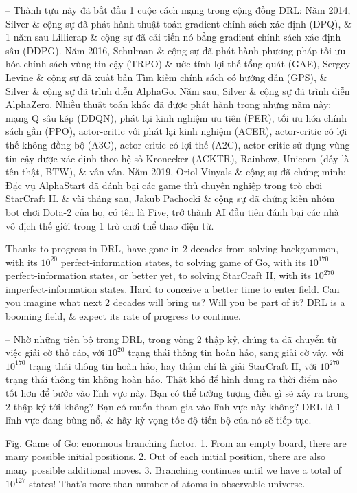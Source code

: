 \documentclass{article}
\begin{document}
\begin{itemize}
\begin{itemize}
\begin{itemize}
\begin{itemize}
                -- Thành tựu này đã bắt đầu 1 cuộc cách mạng trong cộng đồng DRL: Năm 2014, Silver \& cộng sự đã phát hành thuật toán gradient chính sách xác định (DPQ), \& 1 năm sau Lillicrap \& cộng sự đã cải tiến nó bằng gradient chính sách xác định sâu (DDPG). Năm 2016, Schulman \& cộng sự đã phát hành phương pháp tối ưu hóa chính sách vùng tin cậy (TRPO) \& ước tính lợi thế tổng quát (GAE), Sergey Levine \& cộng sự đã xuất bản Tìm kiếm chính sách có hướng dẫn (GPS), \& Silver \& cộng sự đã trình diễn AlphaGo. Năm sau, Silver \& cộng sự đã trình diễn AlphaZero. Nhiều thuật toán khác đã được phát hành trong những năm này: mạng Q sâu kép (DDQN), phát lại kinh nghiệm ưu tiên (PER), tối ưu hóa chính sách gần (PPO), actor-critic với phát lại kinh nghiệm (ACER), actor-critic có lợi thế không đồng bộ (A3C), actor-critic có lợi thế (A2C), actor-critic sử dụng vùng tin cậy được xác định theo hệ số Kronecker (ACKTR), Rainbow, Unicorn (đây là tên thật, BTW), \& vân vân. Năm 2019, Oriol Vinyals \& cộng sự đã chứng minh: Đặc vụ AlphaStart đã đánh bại các game thủ chuyên nghiệp trong trò chơi StarCraft II. \& vài tháng sau, Jakub Pachocki \& cộng sự đã chứng kiến nhóm bot chơi Dota-2 của họ, có tên là Five, trở thành AI đầu tiên đánh bại các nhà vô địch thế giới trong 1 trò chơi thể thao điện tử.

                Thanks to progress in DRL, have gone in 2 decades from solving backgammon, with its $10^{20}$ perfect-information states, to solving game of Go, with its $10^{170}$ perfect-information states, or better yet, to solving StarCraft II, with its $10^{270}$ imperfect-information states. Hard to conceive a better time to enter field. Can you imagine what next 2 decades will bring us? Will you be part of it? DRL is a booming field, \& expect its rate of progress to continue.

                -- Nhờ những tiến bộ trong DRL, trong vòng 2 thập kỷ, chúng ta đã chuyển từ việc giải cờ thỏ cáo, với $10^{20}$ trạng thái thông tin hoàn hảo, sang giải cờ vây, với $10^{170}$ trạng thái thông tin hoàn hảo, hay thậm chí là giải StarCraft II, với $10^{270}$ trạng thái thông tin không hoàn hảo. Thật khó để hình dung ra thời điểm nào tốt hơn để bước vào lĩnh vực này. Bạn có thể tưởng tượng điều gì sẽ xảy ra trong 2 thập kỷ tới không? Bạn có muốn tham gia vào lĩnh vực này không? DRL là 1 lĩnh vực đang bùng nổ, \& hãy kỳ vọng tốc độ tiến bộ của nó sẽ tiếp tục.

                {\sf Fig. Game of Go: enormous branching factor.} 1. From an empty board, there are many possible initial positions. 2. Out of each initial position, there are also many possible additional moves. 3. Branching continues until we have a total of $10^{127}$ states! That's more than number of atoms in observable universe.


\end{itemize}
\end{itemize}
\end{itemize}
\end{itemize}
\end{document}
